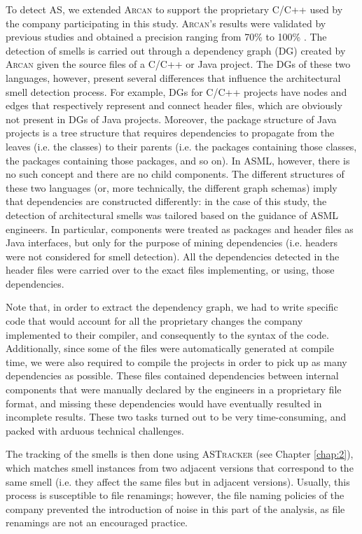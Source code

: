 To detect AS, we extended \textsc{Arcan} to support the proprietary C/C++ used by the company participating in this study. 
\textsc{Arcan}'s results were validated by previous studies and obtained a precision ranging from 70\% to 100\% \cite{Arcelli2020,Arcelli2017}.
The detection of smells is carried out through a dependency graph (DG) created by \textsc{Arcan} given the source files of a C/C++ or Java project.
The DGs of these two languages, however, present several differences that influence the architectural smell detection process.
For example, DGs for C/C++ projects have nodes and edges that respectively represent and connect header files, which are obviously not present in DGs of Java projects.
Moreover, the package structure of Java projects is a tree structure that requires dependencies to propagate from the leaves (i.e. the classes) to their parents (i.e. the packages containing those classes, the packages containing those packages, and so on).
In ASML, however, there is no such concept and there are no child components.
The different structures of these two languages (or, more technically, the different graph schemas) imply that dependencies are constructed differently: in the case of this study, the detection of architectural smells was tailored based on the guidance of ASML engineers.
In particular, components were treated as packages and header files as Java interfaces, but only for the purpose of mining dependencies (i.e. headers were not considered for smell detection).
All the dependencies detected in the header files were carried over to the exact files implementing, or using, those dependencies.

Note that, in order to extract the dependency graph, we had to write specific code that would account for all the proprietary changes the company implemented to their compiler, and consequently to the syntax of the code. 
Additionally, since some of the files were automatically generated at compile time, we were also required to compile the projects in order to pick up as many dependencies as possible. These files contained dependencies between internal components that were manually declared by the engineers in a proprietary file format, and missing these dependencies would have eventually resulted in incomplete results.
These two tasks turned out to be very time-consuming, and packed with arduous technical challenges.

The tracking of the smells is then done using \textsc{ASTracker} (see Chapter \ref{chap:2}), which matches smell instances from two adjacent versions that correspond to the same smell (i.e. they affect the same files but in adjacent versions).
Usually, this process is susceptible to file renamings; however, the file naming policies of the company prevented the introduction of noise in this part of the analysis, as file renamings are not an encouraged practice.

